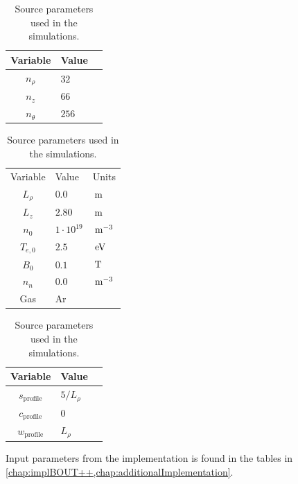 \begin{table}[!htb]
    \begin{minipage}{.3\linewidth}
      \centering
      \caption{Grid size used for the simulations.}
        \begin{tabular}{c|ll}
        \hline\hline
        Variable & Value \\
        \hline
        $n_\rho$   & $32$  \\
        $n_z$      & $66$  \\
        $n_\theta$ & $256$ \\
        \hline\hline
        \end{tabular}
        \label{tb:grid}
    \end{minipage}%
    \hfill
    \begin{minipage}{.3\linewidth}
      \centering
        \caption{Standard parameters used in the simulations.}
            \begin{tabular}{c|ll}
            \hline\hline
            Variable & Value & Units\\
            $L_\rho$  & $0.0$            & $\, \text{m}$     \\
            $L_z$     & $2.80$           & $ \, \text{m}$    \\
            $n_0$     & $1\cdot 10^{19}$ & $\, \text{m}^{-3}$\\
            $T_{e,0}$ & $2.5$            & $\, \text{eV}$    \\
            $B_0$     & $0.1$            & $\, \text{T}$     \\
            $n_n$     & $0.0$            & $\, \text{m}^{-3}$\\
            Gas       & Ar               &          \\
            \hline\hline
            \end{tabular}
            \label{tb:input}
    \end{minipage}
    \hfill
    \begin{minipage}{.3\linewidth}
      \centering
        \caption{Source parameters used in the simulations.}
            \begin{tabular}{c|ll}
            \hline\hline
            Variable & Value \\
            \hline
            $s_{\text{profile}}$ & $5/L_\rho$\\
            $c_{\text{profile}}$ & $0$       \\
            $w_{\text{profile}}$ & $L_\rho$  \\
            \hline\hline
            \end{tabular}
            \label{tb:source}
    \end{minipage}
\end{table}
%
Input parameters from the implementation is found in the tables in \cref{chap:implBOUT++,chap:additionalImplementation}.

